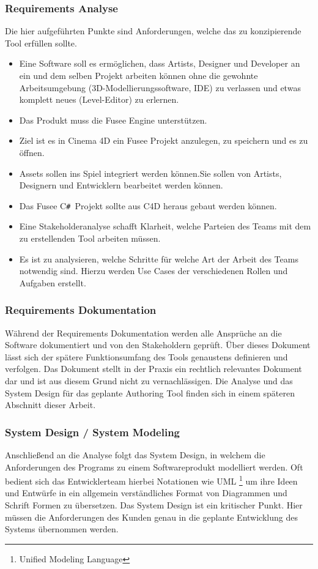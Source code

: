 \documentclass[pagesize, paper=a4, fontsize=12pt, titlepage=true, headings=small, headnosepline, abstractoff, liststotoc, nochapterprefix, plainheadsepline, twoside]{scrreprt}
\newcommand{\CSS}{C\texttt{\# }}
\begin{document}
\subsubsection{Requirements Analyse}
Die hier aufgeführten Punkte sind Anforderungen, welche das zu konzipierende Tool erfüllen sollte.
\begin{itemize}
\item Eine Software soll es ermöglichen, dass Artists, Designer und Developer an ein und dem selben Projekt arbeiten können ohne die gewohnte Arbeitsumgebung (3D-Modellierungssoftware, IDE) zu verlassen und etwas komplett neues (Level-Editor) zu erlernen.
\item Das Produkt muss die Fusee Engine unterstützen.
\item Ziel ist es in Cinema 4D ein Fusee Projekt anzulegen, zu speichern und es zu öffnen.
\item Assets sollen ins Spiel integriert werden können.Sie sollen von Artists, Designern und Entwicklern bearbeitet werden können.
\item Das Fusee \CSS Projekt sollte aus C4D heraus gebaut werden können.
\item Eine Stakeholderanalyse schafft Klarheit, welche Parteien des Teams mit dem zu erstellenden Tool arbeiten müssen.
\item Es ist zu analysieren, welche Schritte für welche Art der Arbeit des Teams notwendig sind. Hierzu werden Use Cases der verschiedenen Rollen und Aufgaben erstellt.
\end{itemize}
\subsubsection{Requirements Dokumentation}
Während der Requirements Dokumentation werden alle Ansprüche an die Software dokumentiert und von den Stakeholdern geprüft. Über dieses Dokument lässt sich der spätere Funktionsumfang des Tools genaustens definieren und verfolgen. Das Dokument stellt in der Praxis ein rechtlich relevantes Dokument dar und ist aus diesem Grund nicht zu vernachlässigen. Die Analyse und das System Design für das geplante Authoring Tool finden sich in einem späteren Abschnitt dieser Arbeit.

\subsubsection{System Design / System Modeling}
Anschließend an die Analyse folgt das System Design, in welchem die Anforderungen des Programs zu einem Softwareprodukt modelliert werden. Oft bedient sich das Entwicklerteam hierbei Notationen wie UML \footnote{Unified Modeling Language} um ihre Ideen und Entwürfe in ein allgemein verständliches Format von Diagrammen und Schrift Formen zu übersetzen. Das System Design ist ein kritischer Punkt. Hier müssen die Anforderungen des Kunden genau in die geplante Entwicklung des Systems übernommen werden.
\end{document}
